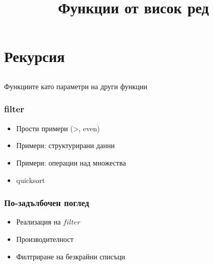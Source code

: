 \documentclass{beamer}
\begin{document}
\title[Увод в курса]{Функции от висок ред}
\frame{\titlepage}

\section{Рекурсия}
\subsection{}

\begin{frame}
  \centerline{Функциите като параметри на други функции}
\end{frame}

\begin{frame}[fragile]
  \frametitle{filter}

  \begin{itemize}
    \item Прости примери (>, even)
    \item Примери: структурирани данни
    \item Примери: операции над множества
    \item quicksort
  \end{itemize}

\end{frame}

\begin{frame}[fragile]
  \frametitle{По-задълбочен поглед}

  \begin{itemize}
    \item Реализация на $filter$
    \item Производителност
    \item Филтриране на безкрайни списъци
  \end{itemize}

  
\end{frame}
\end{document}
